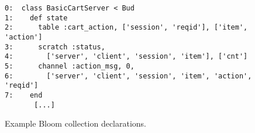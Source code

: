 \begin{comment}
\begin{figure}[t]
\begin{scriptsize}
\begin{verbatim}
 1      class SimplePQueue < Bud
 2      def state
 3        table :q, ['id'], ['payload']
 4        table :min_id, ['id']
 5        table :log, ['id'], ['payload']
 6        scratch :newmins, ['id'], ['payload']
 7        channel :output, 0, ['addr', 'id'], ['payload']
 8      end
 9    
10      declare
11      def dequeue
12        # find min_id value, agg across all items (group=nil)
13        min_id <= q.group(nil, min(q.id))
14    
15        # find the q items with min_id via natural join
16        mins = natjoin [q, min_id] {|q, m| q }
17    
18        # idempotence: ignore items with id previously logged
19        newmins <= mins.map do |q| 
20          q unless log.map{|p| p.id}.include? q.id
21        end
22
23        # in the next timestep, add newmins to log, delete from q
24        log <+ newmins.map{|h| [h.id]}
25        q <- mins.map {|q| q}
26      
27        # ship the min items via the output channel
28        output <+ mins.map{|q| ['192.168.1.1:12345'] + q}
29      end
30    end
\end{verbatim}
\vspace{-10pt}
\caption{Example Bloom code for dequeuing items from a priority queue.}
\label{fig:queue}
\end{scriptsize}
\vspace{-2pt}
\end{figure}

\end{comment}

\begin{figure}[t]
\begin{scriptsize}
\begin{verbatim}
0:  class BasicCartServer < Bud
1:    def state
2:      table :cart_action, ['session', 'reqid'], ['item', 'action']
3:      scratch :status, 
4:        ['server', 'client', 'session', 'item'], ['cnt']
5:      channel :action_msg, 0, 
6:        ['server', 'client', 'session', 'item', 'action', 'reqid']
7:    end
       [...]
\end{verbatim}
\vspace{-10pt}
\caption{Example Bloom collection declarations.}
\label{fig:declarations}
\end{scriptsize}
\vspace{-2pt}
\end{figure}



